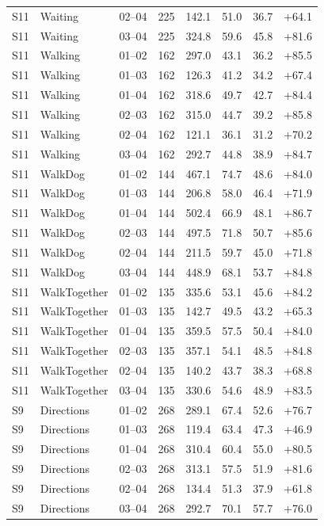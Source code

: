 \begin{center}
{\begin{longtable}{llrrrrrr}
S11 & Waiting & 02--04 & 225 & 142.1 & 51.0 & 36.7 & +64.1 \\
S11 & Waiting & 03--04 & 225 & 324.8 & 59.6 & 45.8 & +81.6 \\
S11 & Walking & 01--02 & 162 & 297.0 & 43.1 & 36.2 & +85.5 \\
S11 & Walking & 01--03 & 162 & 126.3 & 41.2 & 34.2 & +67.4 \\
S11 & Walking & 01--04 & 162 & 318.6 & 49.7 & 42.7 & +84.4 \\
S11 & Walking & 02--03 & 162 & 315.0 & 44.7 & 39.2 & +85.8 \\
S11 & Walking & 02--04 & 162 & 121.1 & 36.1 & 31.2 & +70.2 \\
S11 & Walking & 03--04 & 162 & 292.7 & 44.8 & 38.9 & +84.7 \\
S11 & WalkDog & 01--02 & 144 & 467.1 & 74.7 & 48.6 & +84.0 \\
S11 & WalkDog & 01--03 & 144 & 206.8 & 58.0 & 46.4 & +71.9 \\
S11 & WalkDog & 01--04 & 144 & 502.4 & 66.9 & 48.1 & +86.7 \\
S11 & WalkDog & 02--03 & 144 & 497.5 & 71.8 & 50.7 & +85.6 \\
S11 & WalkDog & 02--04 & 144 & 211.5 & 59.7 & 45.0 & +71.8 \\
S11 & WalkDog & 03--04 & 144 & 448.9 & 68.1 & 53.7 & +84.8 \\
S11 & WalkTogether & 01--02 & 135 & 335.6 & 53.1 & 45.6 & +84.2 \\
S11 & WalkTogether & 01--03 & 135 & 142.7 & 49.5 & 43.2 & +65.3 \\
S11 & WalkTogether & 01--04 & 135 & 359.5 & 57.5 & 50.4 & +84.0 \\
S11 & WalkTogether & 02--03 & 135 & 357.1 & 54.1 & 48.5 & +84.8 \\
S11 & WalkTogether & 02--04 & 135 & 140.2 & 43.7 & 38.3 & +68.8 \\
S11 & WalkTogether & 03--04 & 135 & 330.6 & 54.6 & 48.9 & +83.5 \\
S9 & Directions & 01--02 & 268 & 289.1 & 67.4 & 52.6 & +76.7 \\
S9 & Directions & 01--03 & 268 & 119.4 & 63.4 & 47.3 & +46.9 \\
S9 & Directions & 01--04 & 268 & 310.4 & 60.4 & 55.0 & +80.5 \\
S9 & Directions & 02--03 & 268 & 313.1 & 57.5 & 51.9 & +81.6 \\
S9 & Directions & 02--04 & 268 & 134.4 & 51.3 & 37.9 & +61.8 \\
S9 & Directions & 03--04 & 268 & 292.7 & 70.1 & 57.7 & +76.0 \\

\end{longtable}}
\end{center}
